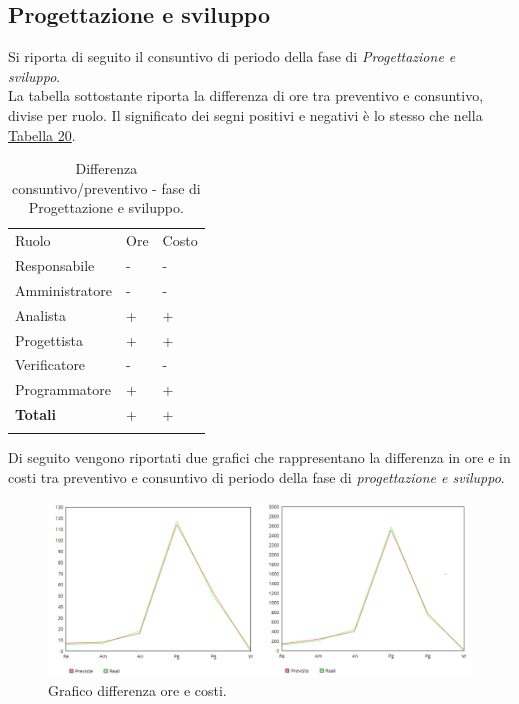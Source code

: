 \documentclass[a4paper]{article}
\begin{document}
			\subsection{Progettazione e sviluppo}
                Si riporta di seguito il consuntivo di periodo della fase di \emph{Progettazione e sviluppo}. \\
                La tabella sottostante riporta la differenza di ore tra preventivo e consuntivo, divise per ruolo. Il significato dei segni
                positivi e negativi è lo stesso che nella \hyperref[DCSceltaCapitolato]{Tabella 20}.
                \begin{table}[H]
					\begin{tabularx}{\textwidth}{Y Y Y}
						Ruolo & Ore & Costo \\
						Responsabile & - & - \\
						Amministratore & - & - \\
						Analista & + & + \\
						Progettista & + & + \\
						Verificatore & - & - \\
						Programmatore & + & + \\
						\textbf{Totali} & + & + \\
					\end{tabularx}
					\caption{Differenza consuntivo/preventivo - fase di Progettazione e sviluppo. } 
					\label{ConsuntivoSviluppo}
				\end{table}
				
				Di seguito vengono riportati due grafici che rappresentano la differenza in ore e in costi tra preventivo e consuntivo di periodo della 
				fase di \emph{progettazione e sviluppo}.
				\begin{figure}[H]
					\centering
					\includegraphics[width=\textwidth]{diff_pr}
					\caption{Grafico differenza ore e costi.}
				\end{figure}
				
\end{document}
